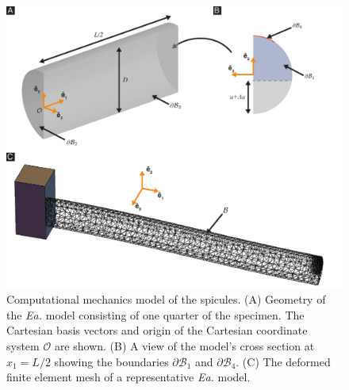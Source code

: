 \documentclass[12pt,onecolumn]{article}
\makeatletter
\newcommand{\EA}{\textit{Ea.\@}\xspace}
\makeatother
\begin{document}
\begin{bibunit}
	\begin{figure}[H]
	\centering
	\includegraphics[width=\textwidth]{../Figures/FigureFEA/FigureA2_V7.pdf}
	\caption{Computational mechanics model of the spicules. (A) Geometry of the \EA model consisting of one quarter of the specimen. The Cartesian basis vectors and origin of the Cartesian coordinate system $\mathcal{O}$ are shown. (B) A view of the model's cross section at $x_1=L/2$ showing the boundaries $\partial \mathcal{B}_1$ and $\partial \mathcal{B}_4$. (C) The deformed finite element mesh of a representative \EA model.}
	\label{fig:FEA}
	\end{figure}
	

\end{bibunit}
\end{document}
